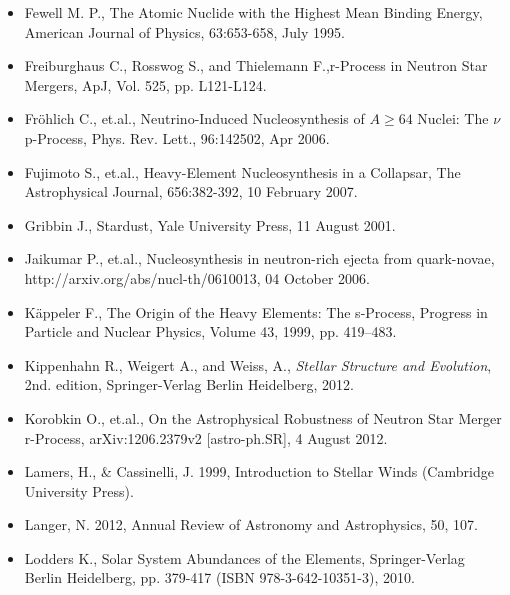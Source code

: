 \begin{itemize}
    \item Fewell M. P., The Atomic Nuclide with the Highest Mean Binding Energy, American Journal of Physics, 63:653-658, July 1995.

    \item Freiburghaus C., Rosswog S., and Thielemann F.,r-Process in Neutron Star Mergers, ApJ, Vol. 525, pp. L121-L124.
    
    \item Fr\"ohlich C., et.al., Neutrino-Induced Nucleosynthesis of $A \geq 64$ Nuclei: The $\nu$p-Process, Phys. Rev. Lett., 96:142502, Apr 2006.
    
    \item Fujimoto S., et.al., Heavy-Element Nucleosynthesis in a Collapsar, The Astrophysical Journal, 656:382-392, 10 February 2007.
    
    \item Gribbin J., Stardust, Yale University Press, 11 August 2001.
    
    \item Jaikumar P., et.al., Nucleosynthesis in neutron-rich ejecta from quark-novae, http://arxiv.org/abs/nucl-th/0610013, 04 October 2006.
    
    \item K\"appeler F., The Origin of the Heavy Elements: The s-Process, Progress in Particle and Nuclear Physics, Volume 43, 1999, pp. 419–483.
    
    \newpage
    \thispagestyle{empty}
    
    \item Kippenhahn R., Weigert A., and Weiss, A., \textit{Stellar Structure and Evolution}, 2nd. edition, Springer-Verlag Berlin Heidelberg, 2012.
    
    \item Korobkin O., et.al., On the Astrophysical Robustness of Neutron Star Merger r-Process, arXiv:1206.2379v2 [astro-ph.SR], 4 August 2012.
    
    \item Lamers, H., \& Cassinelli, J. 1999, Introduction to Stellar Winds (Cambridge University Press).
    
    \item Langer, N. 2012, Annual Review of Astronomy and Astrophysics, 50, 107.
    
    \item Lodders K., Solar System Abundances of the Elements, Springer-Verlag Berlin Heidelberg, pp. 379-417 (ISBN 978-3-642-10351-3), 2010.
    

\end{itemize}
